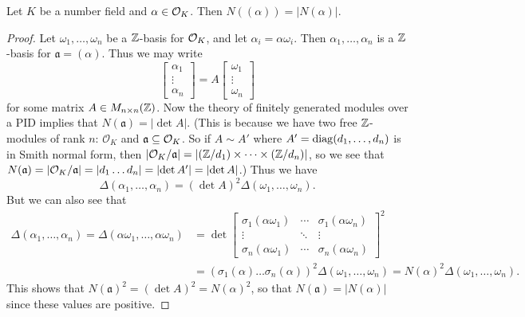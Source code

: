 \begin{theorem}
  Let $K$ be a number field and $\alpha \in \mathcal{O}_K$.
  Then $N((\alpha)) = |N(\alpha)|$.
\end{theorem}

\begin{proof}
  Let $\omega_1, \dots, \omega_n$ be a $\mathbb{Z}$-basis for
  $\mathcal{O}_K$, and let
  $\alpha_i = \alpha \omega_i$. Then
  $\alpha_1, \dots, \alpha_n$ is a $\mathbb{Z}$-basis for
  $\mathfrak{a} = (\alpha)$. Thus we may write
  \[
    \begin{bmatrix}
      \alpha_1 \\ \vdots \\ \alpha_n
    \end{bmatrix}
    = A
    \begin{bmatrix}
      \omega_1 \\ \vdots \\ \omega_n
    \end{bmatrix}
  \]
  for some matrix $A \in M_{n \times n}(\mathbb{Z})$.
  Now the theory of finitely generated modules over
  a PID implies that $N(\mathfrak{a}) = |{\det A}|$. (This
  is because we have two free $\mathbb{Z}$-modules of
  rank $n$: $\mathcal{O}_K$ and $\mathfrak{a} \subseteq \mathcal{O}_K$. So if $A \sim A'$ where $A' = \operatorname{diag}(d_1, \dots, d_n)$ is in Smith normal form, then
  $|\mathcal{O}_K / \mathfrak{a}| = |(\mathbb{Z} / d_1) \times \dots \times (\mathbb{Z} / d_n)|$, so we see that
  $N(\mathfrak{a}) = |\mathcal{O}_K / \mathfrak{a}| = |d_1 \dots d_n| = |{\det A'}| = |{\det A}|$.)
  Thus we have
  \[
    \Delta(\alpha_1, \dots, \alpha_n)
    = (\det A)^2 \Delta(\omega_1, \dots, \omega_n).
  \]
  But we can also see that
  \begin{align*}
    \Delta(\alpha_1, \dots, \alpha_n)
    = \Delta(\alpha \omega_1, \dots, \alpha \omega_n)
    &= \det
    \begin{bmatrix}
      \sigma_1(\alpha \omega_1) & \cdots & \sigma_1(\alpha \omega_n) \\
      \vdots & \ddots & \vdots \\
      \sigma_n(\alpha \omega_1) & \cdots & \sigma_n(\alpha \omega_n)
    \end{bmatrix}^2 \\
    &= (\sigma_1(\alpha) \dots \sigma_n(\alpha))^2 \Delta(\omega_1, \dots, \omega_n)
    = N(\alpha)^2 \Delta(\omega_1, \dots, \omega_n).
  \end{align*}
  This shows that $N(\mathfrak{a})^2 = (\det A)^2 = N(\alpha)^2$,
  so that $N(\mathfrak{a}) = |N(\alpha)|$
  since these values are positive.
\end{proof}
